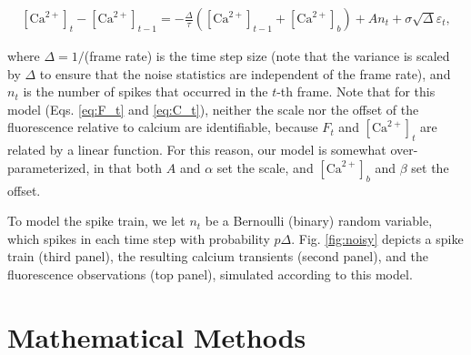 \documentclass[12pt]{article}
\newcommand{\Ca}{[\text{Ca}^{2+}]}
\begin{document}
\begin{align} \label{eq:C_t}
\Ca_t - \Ca_{t-1} = -\frac{\Delta}{\tau}(\Ca_{t-1}+\Ca_b) + A n_t + \sigma \sqrt{\Delta} \varepsilon_{t},
\end{align}

\noindent where $\Delta=1/$(frame rate) is the time step size (note that the variance is scaled by $\Delta$ to ensure that the noise statistics are independent of the frame rate), and $n_t$ is the number of spikes that occurred in the $t$-th frame. Note that for this model (Eqs. \ref{eq:F_t} and \ref{eq:C_t}), neither the scale nor the offset of the fluorescence relative to calcium are identifiable, because $F_t$ and $\Ca_t$ are related by a linear function.  For this reason, our model is somewhat over-parameterized, in that both $A$ and $\alpha$ set the scale, and $\Ca_b$ and $\beta$ set the offset. 

To model the spike train, we let $n_t$ be a Bernoulli (binary) random variable, which spikes in each time step with probability $p \Delta$. Fig. \ref{fig:noisy} depicts a spike train (third panel), the resulting calcium transients (second panel), and the fluorescence observations (top panel), simulated according to this model.

\section*{Mathematical Methods} \label{sec:math_meth}
\end{document}

